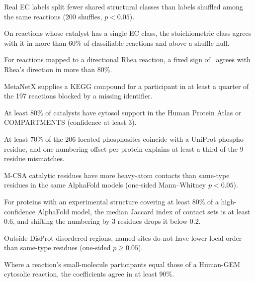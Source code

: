 \begin{description}[style=unboxed,leftmargin=0pt,itemsep=2pt,font=\normalfont\bfseries]
\item[E5] Real EC labels split fewer shared structural classes than labels shuffled among the same reactions (200 shuffles, $p<0.05$).
\item[E6] On reactions whose catalyst has a single EC class, the stoichiometric class agrees with it in more than 60\% of classifiable reactions and above a shuffle null.
\item[R1] For reactions mapped to a directional Rhea reaction, a fixed sign of \DGm\ agrees with Rhea's direction in more than 80\%.
\item[I1] MetaNetX supplies a KEGG compound for a participant in at least a quarter of the 197 reactions blocked by a missing identifier.
\item[L1] At least 80\% of catalysts have cytosol support in the Human Protein Atlas or COMPARTMENTS (confidence at least 3).
\item[S1] At least 70\% of the 206 located phosphosites coincide with a UniProt phospho-residue, and one numbering offset per protein explains at least a third of the 9 residue mismatches.
\item[C1] M-CSA catalytic residues have more heavy-atom contacts than same-type residues in the same AlphaFold models (one-sided Mann--Whitney $p<0.05$).
\item[A1] For proteins with an experimental structure covering at least 80\% of a high-confidence AlphaFold model, the median Jaccard index of contact sets is at least 0.6, and shifting the numbering by 3 residues drops it below 0.2.
\item[D1] Outside DisProt disordered regions, named sites do not have lower local order than same-type residues (one-sided $p\ge0.05$).
\item[G1] Where a reaction's small-molecule participants equal those of a Human-GEM cytosolic reaction, the coefficients agree in at least 90\%.
\end{description}
